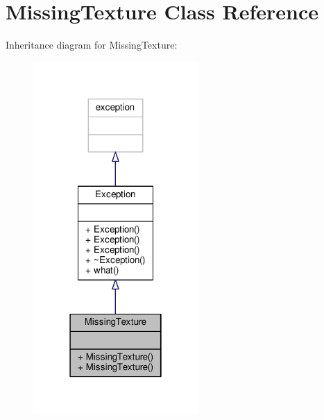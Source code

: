 \hypertarget{classMissingTexture}{}\section{Missing\+Texture Class Reference}
\label{classMissingTexture}


Inheritance diagram for Missing\+Texture\+:
\nopagebreak
\begin{figure}[H]
\begin{center}
\leavevmode
\includegraphics[width=178pt]{d6/d5a/classMissingTexture__inherit__graph}
\end{center}
\end{figure}


